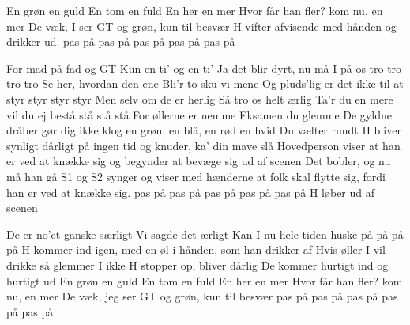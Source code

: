\documentclass[a4paper,11pt]{article}
\begin{document}
  \begin{song}
     	En grøn 
		en guld
		En tom
		en fuld
		En her 
		en mer 
		Hvor får han fler?
		kom nu,
		en mer 
		De væk,
		I ser
		GT
		og grøn,
		kun til besvær
		\scene H vifter afvisende med hånden og drikker ud.
		pas på pas på pas på pas på pas på

		For mad på fad og GT
		Kun en ti'
		og en ti'
		Ja det blir dyrt, nu må I på os tro
		tro 
		tro
		tro
		Se her, hvordan den ene
		Bli'r to sku vi mene
		Og pluds'lig er det ikke til at styr
		styr 
		styr
		styr
		Men selv om de er herlig
		Så tro os helt ærlig
		Ta'r du en mere vil du ej bestå
		stå 
		stå
		stå
		For øllerne er nemme
		Eksamen du glemme
		De gyldne dråber gør dig ikke klog
		en grøn, 
		en blå,
		en rød
		en hvid
		Du vælter rundt
		\scene H bliver synligt dårligt
		på ingen tid
		og knuder,  ka' din mave slå
		\scene Hovedperson viser at han er ved at knække sig og begynder at bevæge sig ud af scenen
		Det bobler,
		og nu må han gå
		\scene S1 og S2 synger og viser med hænderne at folk skal flytte sig, fordi han er ved at knække sig.
		pas på pas på pas på pas på pas på
		\scene H løber ud af scenen


		De er no'et ganske særligt
		Vi sagde det ærligt
		Kan I nu hele tiden huske på
		på
		på
		på
		\scene H kommer ind igen, med en øl i hånden, som han drikker af
		Hvis øller I vil drikke
		så glemmer I ikke
		\scene H stopper op, bliver dårlig
		De kommer hurtigt ind og hurtigt ud
		En grøn
		en guld
		En tom
		en fuld
		En her
		en mer
		Hvor får han fler?
		kom nu,
		en mer
		De væk,
		jeg ser
		GT
		og grøn,
		kun til besvær
		pas på pas på pas på pas på pas på

  \end{song}
\end{document}
